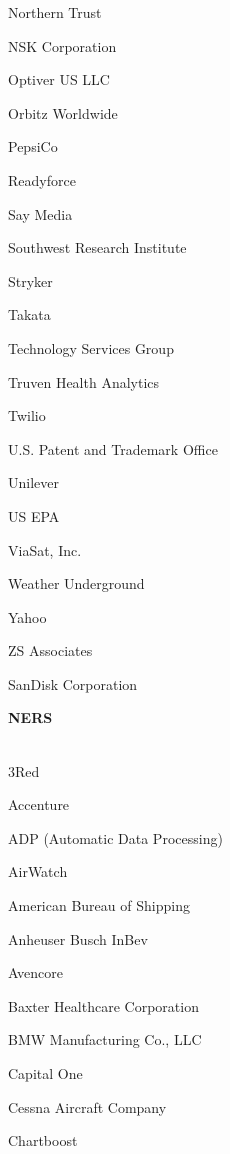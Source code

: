 \documentclass[twoside]{article}
\begin{document}
\begin{center}
\begin{multicols}{5}
\begin{FlushLeft}
\begin{compactitem}
\item Northern Trust
\item NSK Corporation
\item Optiver US LLC
\item Orbitz Worldwide
\item PepsiCo
\item Readyforce
\item Say Media
\item Southwest Research Institute
\item Stryker
\item Takata
\item Technology Services Group
\item Truven Health Analytics
\item Twilio
\item U.S. Patent and Trademark Office
\item Unilever
\item US EPA
\item ViaSat, Inc.
\item Weather Underground
\item Yahoo
\item ZS Associates
\item SanDisk Corporation
\end{compactitem}
        \end{FlushLeft}
        \vspace{1em}
        {\fontsize{14}{16}\selectfont \bf NERS}\\
        \vspace{-1em}
        ~\hrulefill~
        \vspace{-.9em}
        \begin{FlushLeft}
        \begin{compactitem}
        \item 3Red
\item Accenture
\item ADP (Automatic Data Processing)
\item AirWatch
\item American Bureau of Shipping
\item Anheuser Busch InBev
\item Avencore
\item Baxter Healthcare Corporation
\item BMW Manufacturing Co., LLC
\item Capital One
\item Cessna Aircraft Company
\item Chartboost

\end{compactitem}
\end{FlushLeft}
\end{multicols}
\end{center}
\end{document}

